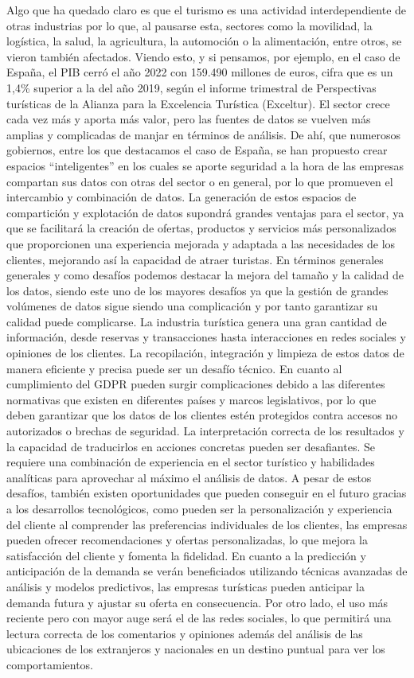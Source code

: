 \documentclass[
  letterpaper,
  DIV=11,
  numbers=noendperiod]{scrreprt}
\begin{document}
Algo que ha quedado claro es que el turismo es una actividad
interdependiente de otras industrias por lo que, al pausarse esta,
sectores como la movilidad, la logística, la salud, la agricultura, la
automoción o la alimentación, entre otros, se vieron también afectados.
Viendo esto, y si pensamos, por ejemplo, en el caso de España, el PIB
cerró el año 2022 con 159.490 millones de euros, cifra que es un 1,4\%
superior a la del año 2019, según el informe trimestral de Perspectivas
turísticas de la Alianza para la Excelencia Turística (Exceltur). El
sector crece cada vez más y aporta más valor, pero las fuentes de datos
se vuelven más amplias y complicadas de manjar en términos de análisis.
De ahí, que numerosos gobiernos, entre los que destacamos el caso de
España, se han propuesto crear espacios ``inteligentes'' en los cuales
se aporte seguridad a la hora de las empresas compartan sus datos con
otras del sector o en general, por lo que promueven el intercambio y
combinación de datos. La generación de estos espacios de compartición y
explotación de datos supondrá grandes ventajas para el sector, ya que se
facilitará la creación de ofertas, productos y servicios más
personalizados que proporcionen una experiencia mejorada y adaptada a
las necesidades de los clientes, mejorando así la capacidad de atraer
turistas. En términos generales generales y como desafíos podemos
destacar la mejora del tamaño y la calidad de los datos, siendo este uno
de los mayores desafíos ya que la gestión de grandes volúmenes de datos
sigue siendo una complicación y por tanto garantizar su calidad puede
complicarse. La industria turística genera una gran cantidad de
información, desde reservas y transacciones hasta interacciones en redes
sociales y opiniones de los clientes. La recopilación, integración y
limpieza de estos datos de manera eficiente y precisa puede ser un
desafío técnico. En cuanto al cumplimiento del GDPR pueden surgir
complicaciones debido a las diferentes normativas que existen en
diferentes países y marcos legislativos, por lo que deben garantizar que
los datos de los clientes estén protegidos contra accesos no autorizados
o brechas de seguridad. La interpretación correcta de los resultados y
la capacidad de traducirlos en acciones concretas pueden ser
desafiantes. Se requiere una combinación de experiencia en el sector
turístico y habilidades analíticas para aprovechar al máximo el análisis
de datos. A pesar de estos desafíos, también existen oportunidades que
pueden conseguir en el futuro gracias a los desarrollos tecnológicos,
como pueden ser la personalización y experiencia del cliente al
comprender las preferencias individuales de los clientes, las empresas
pueden ofrecer recomendaciones y ofertas personalizadas, lo que mejora
la satisfacción del cliente y fomenta la fidelidad. En cuanto a la
predicción y anticipación de la demanda se verán beneficiados utilizando
técnicas avanzadas de análisis y modelos predictivos, las empresas
turísticas pueden anticipar la demanda futura y ajustar su oferta en
consecuencia. Por otro lado, el uso más reciente pero con mayor auge
será el de las redes sociales, lo que permitirá una lectura correcta de
los comentarios y opiniones además del análisis de las ubicaciones de
los extranjeros y nacionales en un destino puntual para ver los
comportamientos.
\end{document}
